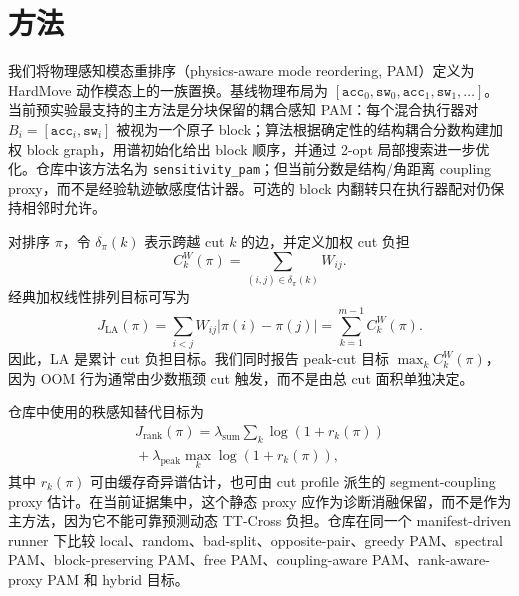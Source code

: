 \section{方法}

我们将物理感知模态重排序（physics-aware mode reordering, PAM）定义为 HardMove 动作模态上的一族置换。基线物理布局为
\([\texttt{acc}_0,\texttt{sw}_0,\texttt{acc}_1,\texttt{sw}_1,\ldots]\)。当前预实验最支持的主方法是分块保留的耦合感知 PAM：每个混合执行器对 \(B_i=[\texttt{acc}_i,\texttt{sw}_i]\) 被视为一个原子 block；算法根据确定性的结构耦合分数构建加权 block graph，用谱初始化给出 block 顺序，并通过 2-opt 局部搜索进一步优化。仓库中该方法名为 \texttt{sensitivity\_pam}；但当前分数是结构/角距离 coupling proxy，而不是经验轨迹敏感度估计器。可选的 block 内翻转只在执行器配对仍保持相邻时允许。

对排序 \(\pi\)，令 \(\delta_\pi(k)\) 表示跨越 cut \(k\) 的边，并定义加权 cut 负担
\begin{equation}
C_k^W(\pi)=\sum_{(i,j)\in \delta_\pi(k)} W_{ij}.
\end{equation}
经典加权线性排列目标可写为
\begin{equation}
J_{\mathrm{LA}}(\pi)=\sum_{i<j} W_{ij}|\pi(i)-\pi(j)|
= \sum_{k=1}^{m-1} C_k^W(\pi).
\end{equation}
因此，LA 是累计 cut 负担目标。我们同时报告 peak-cut 目标 \(\max_k C_k^W(\pi)\)，因为 OOM 行为通常由少数瓶颈 cut 触发，而不是由总 cut 面积单独决定。

仓库中使用的秩感知替代目标为
\begin{equation}
\begin{aligned}
J_{\mathrm{rank}}(\pi) =
\lambda_{\mathrm{sum}}\sum_k \log(1 + r_k(\pi)) \\
{}+\lambda_{\mathrm{peak}}\max_k \log(1 + r_k(\pi)),
\end{aligned}
\end{equation}
其中 \(r_k(\pi)\) 可由缓存奇异谱估计，也可由 cut profile 派生的 segment-coupling proxy 估计。在当前证据集中，这个静态 proxy 应作为诊断消融保留，而不是作为主方法，因为它不能可靠预测动态 TT-Cross 负担。仓库在同一个 manifest-driven runner 下比较 local、random、bad-split、opposite-pair、greedy PAM、spectral PAM、block-preserving PAM、free PAM、coupling-aware PAM、rank-aware-proxy PAM 和 hybrid 目标。
